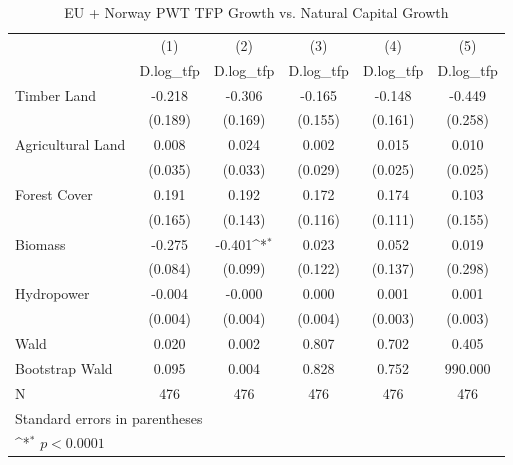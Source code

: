 \begin{table}[htbp]\centering
\def\sym#1{\ifmmode^{#1}\else\(^{#1}\)\fi}
\caption{EU + Norway PWT TFP Growth vs. Natural Capital Growth}
\begin{tabular}{l*{5}{c}}
\hline\hline
            &\multicolumn{1}{c}{(1)}&\multicolumn{1}{c}{(2)}&\multicolumn{1}{c}{(3)}&\multicolumn{1}{c}{(4)}&\multicolumn{1}{c}{(5)}\\
            &\multicolumn{1}{c}{D.log\_tfp}&\multicolumn{1}{c}{D.log\_tfp}&\multicolumn{1}{c}{D.log\_tfp}&\multicolumn{1}{c}{D.log\_tfp}&\multicolumn{1}{c}{D.log\_tfp}\\
\hline
Timber Land &      -0.218       &      -0.306       &      -0.165       &      -0.148       &      -0.449       \\
            &     (0.189)       &     (0.169)       &     (0.155)       &     (0.161)       &     (0.258)       \\
[1em]
Agricultural Land &       0.008       &       0.024       &       0.002       &       0.015       &       0.010       \\
            &     (0.035)       &     (0.033)       &     (0.029)       &     (0.025)       &     (0.025)       \\
[1em]
Forest Cover &       0.191       &       0.192       &       0.172       &       0.174       &       0.103       \\
            &     (0.165)       &     (0.143)       &     (0.116)       &     (0.111)       &     (0.155)       \\
[1em]
Biomass &      -0.275       &      -0.401\sym{*}&       0.023       &       0.052       &       0.019       \\
            &     (0.084)       &     (0.099)       &     (0.122)       &     (0.137)       &     (0.298)       \\
[1em]
Hydropower &      -0.004       &      -0.000       &       0.000       &       0.001       &       0.001       \\
            &     (0.004)       &     (0.004)       &     (0.004)       &     (0.003)       &     (0.003)       \\
\hline
Wald        &       0.020       &       0.002       &       0.807       &       0.702       &       0.405       \\
Bootstrap Wald&       0.095       &       0.004       &       0.828       &       0.752       &     990.000       \\
N           &         476       &         476       &         476       &         476       &         476       \\
\hline\hline
\multicolumn{6}{l}{\footnotesize Standard errors in parentheses}\\
\multicolumn{6}{l}{\footnotesize \sym{*} \(p<0.0001\)}\\
\end{tabular}
\end{table}
